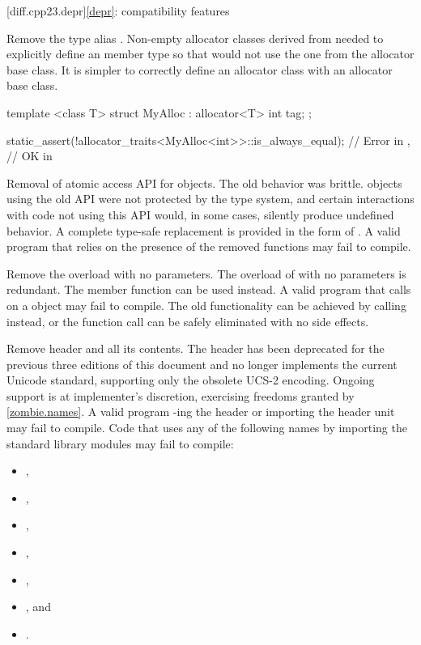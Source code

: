 [diff.cpp23.depr]{\ref*{depr}: compatibility features}

\nodiffref
\change
Remove the type alias .
\rationale
Non-empty allocator classes derived from  needed to explicitly
define an  member type so that 
would not use the one from the allocator base class.
\effect
It is simpler to correctly define an allocator class with an allocator base
class.
\begin{example}
\begin{codeblock}
template <class T>
struct MyAlloc : allocator<T> {
  int tag;
};

static_assert(!allocator_traits<MyAlloc<int>>::is_always_equal);        // Error in \CppXXIII{},
                                                                        // OK in \CppXXVI{}
\end{codeblock}
\end{example}

\nodiffref
\change
Removal of atomic access API for  objects.
\rationale
The old behavior was brittle.  objects using the old API were
not protected by the type system, and certain interactions with code not using
this API would, in some cases, silently produce undefined behavior. A complete
type-safe replacement is provided in the form of .
\effect
A valid \CppXXIII{} program that relies on the presence of the removed functions
may fail to compile.

\nodiffref
\change
Remove the  overload with no parameters.
\rationale
The overload of  with no parameters is redundant.
The  member function can be used instead.
\effect
A valid \CppXXIII{} program that calls 
on a  object may fail to compile.
The old functionality can be achieved by calling  instead,
or the function call can be safely eliminated with no side effects.

\nodiffref
\change
Remove header  and all its contents.
\rationale
The header has been deprecated for the previous three editions of this document
and no longer implements the current Unicode standard, supporting only the
obsolete UCS-2 encoding.
Ongoing support is at implementer's discretion,
exercising freedoms granted by \ref{zombie.names}.
\effect
A valid \CppXXIII{} program -ing the header or importing the
header unit may fail to compile. Code that uses any of the following names by
importing the standard library modules may fail to compile:
\begin{itemize}
\item {},
\item {},
\item {},
\item {},
\item {},
\item {}, and
\item {}.
\end{itemize}

